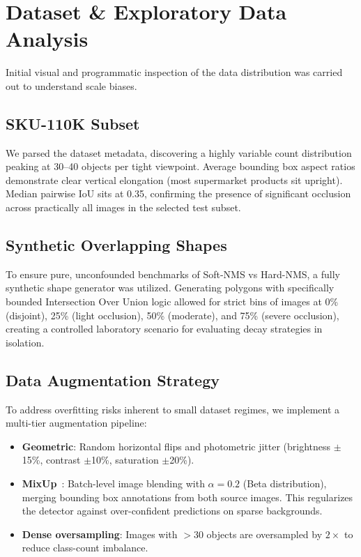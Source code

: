 \documentclass[conference]{IEEEtran}
\begin{document}
\section{Dataset \& Exploratory Data Analysis}
\label{sec:eda}

Initial visual and programmatic inspection of the data distribution was
carried out to understand scale biases.

\subsection{SKU-110K Subset}
We parsed the dataset metadata, discovering a highly variable count
distribution peaking at 30--40 objects per tight viewpoint. Average bounding
box aspect ratios demonstrate clear vertical elongation (most supermarket
products sit upright). Median pairwise IoU sits at 0.35, confirming the
presence of significant occlusion across practically all images in the
selected test subset.

\subsection{Synthetic Overlapping Shapes}
To ensure pure, unconfounded benchmarks of Soft-NMS vs Hard-NMS, a fully
synthetic shape generator was utilized. Generating polygons with specifically
bounded Intersection Over Union logic allowed for strict bins of images at
0\% (disjoint), 25\% (light occlusion), 50\% (moderate), and 75\% (severe
occlusion), creating a controlled laboratory scenario for evaluating decay
strategies in isolation.

\subsection{Data Augmentation Strategy}
\label{sec:augmentation}

To address overfitting risks inherent to small dataset regimes, we
implement a multi-tier augmentation pipeline:

\begin{itemize}
  \item \textbf{Geometric}: Random horizontal flips and photometric jitter
    (brightness $\pm$15\%, contrast $\pm$10\%, saturation $\pm$20\%).
  \item \textbf{MixUp}~\cite{zhang2018mixup}: Batch-level image blending
    with $\alpha = 0.2$ (Beta distribution), merging bounding box
    annotations from both source images. This regularizes the detector
    against over-confident predictions on sparse backgrounds.
  \item \textbf{Dense oversampling}: Images with $>$30 objects are
    oversampled by $2\times$ to reduce class-count imbalance.
\end{itemize}
\end{document}
